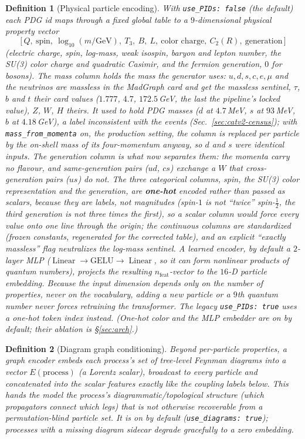 \documentclass[11pt]{article}
\newcommand{\code}[1]{\texttt{#1}}
\newtheorem{definition}{Definition}
\begin{document}
\begin{definition}[Physical particle encoding]\label{def:enc}
With \code{use\_PIDs: false} (the default) each PDG id maps through a fixed global table
to a $9$-dimensional \emph{physical property vector}
\[
  \bigl[\,Q,\ \text{spin},\ \log_{10}(m/\mathrm{GeV}),\ T_3,\ B,\ L,\ \text{color charge},\ C_2(R),\ \text{generation}\,\bigr]
\]
(electric charge, spin, log-mass, weak isospin, baryon and lepton number, the SU(3) color
charge and quadratic Casimir, and the fermion generation, $0$ for bosons). The mass column
holds the mass \emph{the generator uses}: $u,d,s,c,e,\mu$ and the neutrinos are massless in
the MadGraph card and get the massless sentinel, $\tau$, $b$ and $t$ their card values
($1.777$, $4.7$, $172.5$\,GeV, the last the pipeline's locked value), $Z$, $W$, $H$ theirs. It
used to hold PDG masses ($d$ at $4.7$\,MeV, $s$ at $93$\,MeV, $b$ at $4.18$\,GeV), a label
inconsistent with the events (Sec.~\ref{sec:catv2-census}); with \code{mass\_from\_momenta}
on, the production setting, the column is replaced per particle by the on-shell mass of its
four-momentum anyway, so $d$ and $s$ were identical inputs. The generation column is what
now separates them: the momenta carry no flavour, and same-generation pairs ($ud$, $cs$)
exchange a $W$ that cross-generation pairs ($us$) do not. The three \emph{categorical}
columns, spin, the SU(3) color representation and the generation, are \textbf{one-hot}
encoded rather than passed as scalars, because they are labels, not magnitudes (spin-$1$
is not ``twice'' spin-$\tfrac12$, the third generation is not three times the first), so a
scalar column would force every value onto one line through the origin; the continuous
columns are standardized (frozen constants, regenerated for the corrected table), and an
explicit ``exactly massless'' flag neutralizes the log-mass sentinel. A
learned encoder, by default a $2$-layer MLP ($\operatorname{Linear}\!\to\!\text{GELU}\!\to\!\operatorname{Linear}$,
so it can form nonlinear products of quantum numbers), projects the resulting
$n_{\mathrm{feat}}$-vector to the $16$-D particle embedding. Because the input dimension depends
only on the number of \emph{properties}, never on the vocabulary, adding a new particle or a
$9$th quantum number never forces retraining the transformer. The legacy \code{use\_PIDs: true}
uses a one-hot token index instead. (One-hot color and the MLP embedder are on by default; their
ablation is \S\ref{sec:arch}.)
\end{definition}

\begin{definition}[Diagram graph conditioning]\label{def:diag}
Beyond per-particle properties, a graph encoder embeds each process's set of tree-level
Feynman diagrams into a vector $E(\text{process})$ (a Lorentz scalar), broadcast to every
particle and concatenated into the scalar features exactly like the coupling labels below.
This hands the model the process's diagrammatic/topological structure (which propagators
connect which legs) that is not otherwise recoverable from a permutation-blind particle set.
It is on by default (\code{use\_diagrams: true}); processes with a missing diagram sidecar
degrade gracefully to a zero embedding.
\end{definition}
\end{document}
